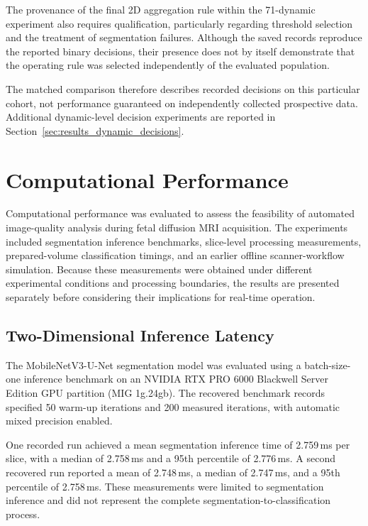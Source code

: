 The provenance of the final 2D aggregation rule within the 71-dynamic experiment also requires qualification, particularly regarding threshold selection and the treatment of segmentation failures. Although the saved records reproduce the reported binary decisions, their presence does not by itself demonstrate that the operating rule was selected independently of the evaluated population.

The matched comparison therefore describes recorded decisions on this particular cohort, not performance guaranteed on independently collected prospective data. Additional dynamic-level decision experiments are reported in Section~\ref{sec:results_dynamic_decisions}.

\section{Computational Performance}
\label{sec:results_computational_performance}

Computational performance was evaluated to assess the feasibility of automated image-quality analysis during fetal diffusion MRI acquisition. The experiments included segmentation inference benchmarks, slice-level processing measurements, prepared-volume classification timings, and an earlier offline scanner-workflow simulation. Because these measurements were obtained under different experimental conditions and processing boundaries, the results are presented separately before considering their implications for real-time operation.

\subsection{Two-Dimensional Inference Latency}
\label{subsec:results_2d_latency}

The MobileNetV3-U-Net segmentation model was evaluated using a batch-size-one inference benchmark on an NVIDIA RTX PRO 6000 Blackwell Server Edition GPU partition (MIG 1g.24gb). The recovered benchmark records specified 50 warm-up iterations and 200 measured iterations, with automatic mixed precision enabled.

One recorded run achieved a mean segmentation inference time of 2.759\,ms per slice, with a median of 2.758\,ms and a 95th percentile of 2.776\,ms. A second recovered run reported a mean of 2.748\,ms, a median of 2.747\,ms, and a 95th percentile of 2.758\,ms. These measurements were limited to segmentation inference and did not represent the complete segmentation-to-classification process.

